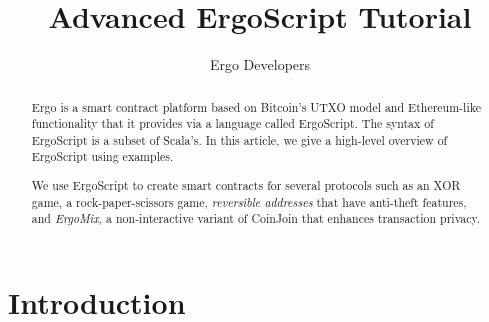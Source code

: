 \documentclass[11pt]{article}
\newcommand{\langname}{ErgoScript\xspace}
\newcommand{\mixname}{ErgoMix\xspace}
\begin{document}
\title{Advanced \langname Tutorial}


\author{Ergo Developers}


\maketitle


\begin{abstract}
Ergo is a smart contract platform based on Bitcoin's UTXO model and Ethereum-like functionality that it provides via a language called \langname. The syntax of \langname is a subset of Scala's. In this article, we give a high-level overview of \langname using examples.



We use \langname to create smart contracts for several protocols such as an XOR game, a rock-paper-scissors game, {\em reversible addresses} that have anti-theft features, and {\em \mixname}, a non-interactive variant of CoinJoin that enhances transaction privacy. 

\end{abstract}

\section{Introduction}
\end{document}
